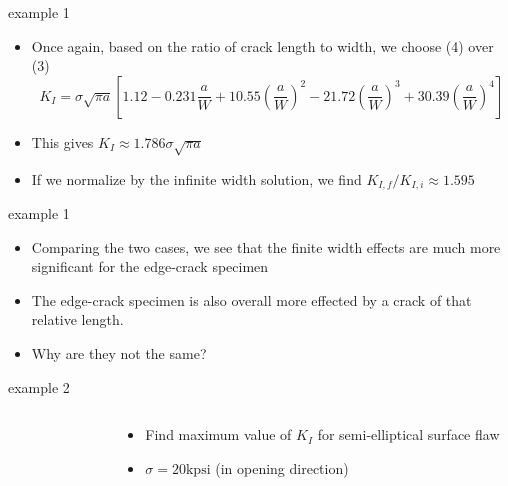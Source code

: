 \documentclass[10pt]{beamer}
\begin{document}
\begin{frame}{example 1}
	\begin{itemize}
		\item Once again, based on the ratio of crack length to width, we choose (4) over (3)
		\begin{equation*}
		K_I = \sigma \sqrt{\pi a}\left[1.12 - 0.231 \frac{a}{W} + 10.55 \left(\frac{a}{W}\right)^2 - 21.72 \left(\frac{a}{W}\right)^3 + 30.39 \left(\frac{a}{W}\right)^4\right]
		\end{equation*}
		\item This gives $K_I \approx 1.786 \sigma \sqrt{\pi a}$
		\item If we normalize by the infinite width solution, we find $K_{I,f}/K_{I,i} \approx 1.595$
	\end{itemize}
\end{frame}

\begin{frame}{example 1}
	\begin{itemize}
		\item Comparing the two cases, we see that the finite width effects are much more significant for the edge-crack specimen
		\item The edge-crack specimen is also overall more effected by a crack of that relative length.
		\item Why are they not the same?
	\end{itemize}
\end{frame}

\begin{frame}{example 2}
	\begin{columns}
		\begin{column}{0.45\textwidth}
			\begin{figure}[H]
				\centering
				\label{fig:problem4}
			\end{figure}
		\end{column}
		\begin{column}{0.45\textwidth}
			\begin{itemize}
				\item Find maximum value of $K_I$ for semi-elliptical surface flaw
				\item $\sigma = 20 \text{kpsi}$ (in opening direction)
			\end{itemize}
		\end{column}
	\end{columns}
\end{frame}
\end{document}
